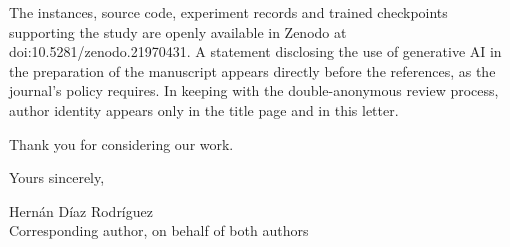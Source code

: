 \documentclass[11pt]{article}
\begin{document}
The instances, source code, experiment records and trained
checkpoints supporting the study are openly available in Zenodo at
doi:10.5281/zenodo.21970431. A statement disclosing the use of
generative AI in the preparation of the manuscript appears directly
before the references, as the journal's policy requires. In keeping
with the double-anonymous review process, author identity appears
only in the title page and in this letter.

Thank you for considering our work.

\vspace{0.7em}
\noindent Yours sincerely,

\vspace{1.2em}
\noindent Hern\'an D\'iaz Rodr\'iguez\\
Corresponding author, on behalf of both authors
\end{document}

